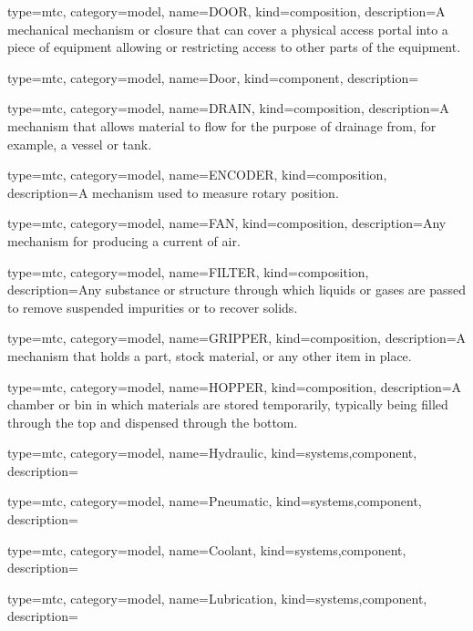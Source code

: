 {
  type=mtc,
  category=model,
  name={DOOR},
  kind={composition},
  description={A mechanical mechanism or closure that can cover a physical access portal into a piece of equipment allowing or restricting access to other parts of the equipment.}
}


{
  type=mtc,
  category=model,
  name={Door},
  kind={component},
  description={}
}


{
  type=mtc,
  category=model,
  name={DRAIN},
  kind={composition},
  description={A mechanism that allows material to flow for the purpose of drainage from, for example, a vessel or tank.}
}


{
  type=mtc,
  category=model,
  name={ENCODER},
  kind={composition},
  description={A mechanism used to measure rotary position.}
}


{
  type=mtc,
  category=model,
  name={FAN},
  kind={composition},
  description={Any mechanism for producing a current of air.}
}


{
  type=mtc,
  category=model,
  name={FILTER},
  kind={composition},
  description={Any substance or structure through which liquids or gases are passed to remove suspended impurities or to recover solids.}
}


{
  type=mtc,
  category=model,
  name={GRIPPER},
  kind={composition},
  description={A mechanism that holds a part, stock material, or any other item in place.}
}


{
  type=mtc,
  category=model,
  name={HOPPER},
  kind={composition},
  description={A chamber or bin in which materials are stored temporarily, typically being filled through the top and dispensed through the bottom.}
}


{
  type=mtc,
  category=model,
  name={Hydraulic},
  kind={systems,component},
  description={}
}


{
  type=mtc,
  category=model,
  name={Pneumatic},
  kind={systems,component},
  description={}
}


{
  type=mtc,
  category=model,
  name={Coolant},
  kind={systems,component},
  description={}
}


{
  type=mtc,
  category=model,
  name={Lubrication},
  kind={systems,component},
  description={}
}


